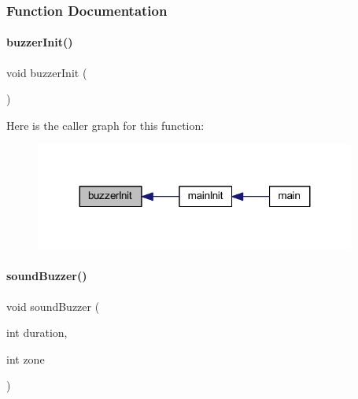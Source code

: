 \subsubsection{Function Documentation}
\mbox{\label{a00011_ab39bc50f65525981c015786371a7892f}} 
\paragraph{buzzer\+Init()}
{\footnotesize\ttfamily void buzzer\+Init (\begin{DoxyParamCaption}{ }\end{DoxyParamCaption})}

Here is the caller graph for this function\+:
\nopagebreak
\begin{figure}[H]
\begin{center}
\leavevmode
\includegraphics[width=299pt]{a00011_ab39bc50f65525981c015786371a7892f_icgraph}
\end{center}
\end{figure}
\mbox{\label{a00011_a31aed89a0638f80bd71a31c50f5cb3ff}} 
\paragraph{sound\+Buzzer()}
{\footnotesize\ttfamily void sound\+Buzzer (\begin{DoxyParamCaption}\item[{int}]{duration,  }\item[{int}]{zone }\end{DoxyParamCaption})}

